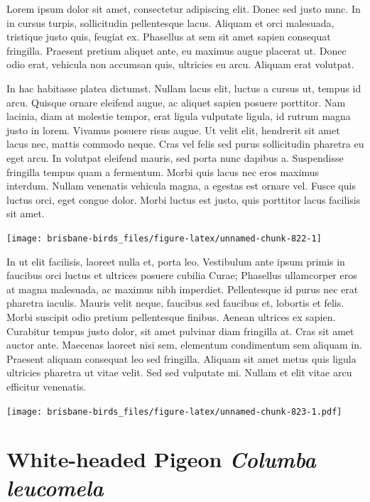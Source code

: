 \documentclass[]{book}
\let\origfigure\figure
\let\endorigfigure\endfigure
\renewenvironment{figure}[1][2] {
  \expandafter\origfigure\expandafter[H]
} {
  \endorigfigure
}
\begin{document}
Lorem ipsum dolor sit amet, consectetur adipiscing elit. Donec sed justo
nunc. In in cursus turpis, sollicitudin pellentesque lacus. Aliquam et
orci malesuada, tristique justo quis, feugiat ex. Phasellus at sem sit
amet sapien consequat fringilla. Praesent pretium aliquet ante, eu
maximus augue placerat ut. Donec odio erat, vehicula non accumsan quis,
ultricies eu arcu. Aliquam erat volutpat.

In hac habitasse platea dictumst. Nullam lacus elit, luctus a cursus ut,
tempus id arcu. Quisque ornare eleifend augue, ac aliquet sapien posuere
porttitor. Nam lacinia, diam at molestie tempor, erat ligula vulputate
ligula, id rutrum magna justo in lorem. Vivamus posuere risus augue. Ut
velit elit, hendrerit sit amet lacus nec, mattis commodo neque. Cras vel
felis sed purus sollicitudin pharetra eu eget arcu. In volutpat eleifend
mauris, sed porta nunc dapibus a. Suspendisse fringilla tempus quam a
fermentum. Morbi quis lacus nec eros maximus interdum. Nullam venenatis
vehicula magna, a egestas est ornare vel. Fusce quis luctus orci, eget
congue dolor. Morbi luctus est justo, quis porttitor lacus facilisis sit
amet.

\begin{figure}
\texttt{[image: brisbane-birds\_files/figure-latex/unnamed-chunk-822-1]} \caption{insert figure caption}\label{fig:unnamed-chunk-822}
\end{figure}

In ut elit facilisis, laoreet nulla et, porta leo. Vestibulum ante ipsum
primis in faucibus orci luctus et ultrices posuere cubilia Curae;
Phasellus ullamcorper eros at magna malesuada, ac maximus nibh
imperdiet. Pellentesque id purus nec erat pharetra iaculis. Mauris velit
neque, faucibus sed faucibus et, lobortis et felis. Morbi suscipit odio
pretium pellentesque finibus. Aenean ultrices ex sapien. Curabitur
tempus justo dolor, sit amet pulvinar diam fringilla at. Cras sit amet
auctor ante. Maecenas laoreet nisi sem, elementum condimentum sem
aliquam in. Praesent aliquam consequat leo sed fringilla. Aliquam sit
amet metus quis ligula ultricies pharetra ut vitae velit. Sed sed
vulputate mi. Nullam et elit vitae arcu efficitur venenatis.

\begin{figure}
\centering
\texttt{[image: brisbane-birds\_files/figure-latex/unnamed-chunk-823-1.pdf]}
\caption{\label{fig:unnamed-chunk-823}insert figure caption}
\end{figure}

\section{\texorpdfstring{White-headed Pigeon \emph{Columba
leucomela}}{White-headed Pigeon Columba leucomela}}\label{white-headed-pigeon-columba-leucomela}
\end{document}
